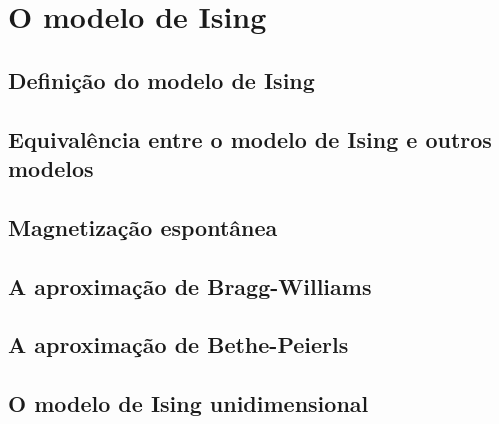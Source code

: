 \chapter{O modelo de Ising}
\noindent

\section{Defini\c{c}\~ao do modelo de Ising}
\noindent

\section{Equival\^encia entre o modelo de Ising e outros modelos}
\noindent

\section{Magnetiza\c{c}\~ao espont\^anea}
\noindent

\section{A aproxima\c{c}\~ao de Bragg-Williams}
\noindent

\section{A aproxima\c{c}\~ao de Bethe-Peierls}
\noindent

\section{O modelo de Ising unidimensional}
\noindent
